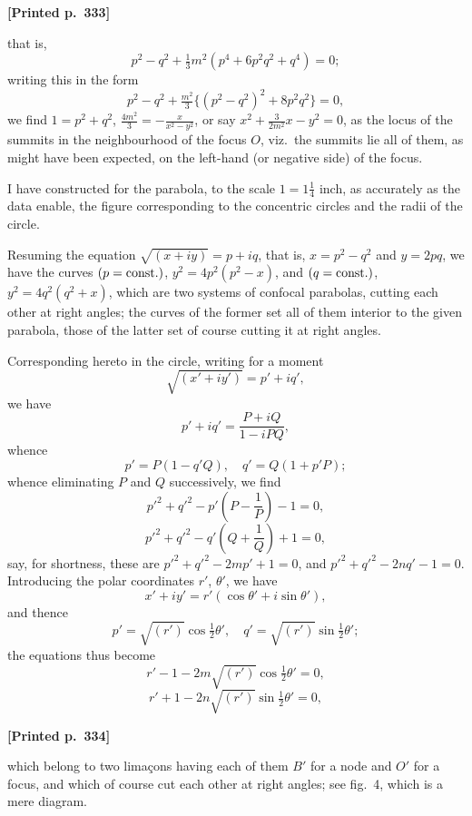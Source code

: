 \documentclass[11pt]{article}
\begin{document}
\medskip

\noindent\textbf{[Printed p.~333]}\hfill

\noindent that is,
\[
p^{2} - q^{2} + \tfrac{1}{3}m^{2}(p^{4} + 6p^{2}q^{2} + q^{4}) = 0;
\]
writing this in the form
\[
p^{2} - q^{2} + \tfrac{m^{2}}{3}\bigl\{(p^{2}-q^{2})^{2} + 8p^{2}q^{2}\bigr\} = 0,
\]
we find $1=p^{2}+q^{2}$, $\tfrac{4m^{2}}{3}=-\tfrac{x}{x^{2}-y^{2}}$, or say $x^{2}+\tfrac{3}{2m^{2}}x - y^{2}=0$, as the locus of the summits in the neighbourhood of the focus $O$, viz.\ the summits lie all of them, as might have been expected, on the left-hand (or negative side) of the focus.

I have constructed for the parabola, to the scale $1=1\tfrac{1}{4}$ inch, as accurately as the data enable, the figure corresponding to the concentric circles and the radii of the circle.

Resuming the equation $\sqrt{(x+iy)}=p+iq$, that is, $x=p^{2}-q^{2}$ and $y=2pq$, we have the curves $(p=\textnormal{const.})$, $y^{2}=4p^{2}(p^{2}-x)$, and $(q=\textnormal{const.})$, $y^{2}=4q^{2}(q^{2}+x)$, which are two systems of confocal parabolas, cutting each other at right angles; the curves of the former set all of them interior to the given parabola, those of the latter set of course cutting it at right angles.

Corresponding hereto in the circle, writing for a moment
\[
\sqrt{(x'+iy')} = p'+iq',
\]
we have
\[
p'+iq' = \frac{P+iQ}{1-iPQ},
\]
whence
\[
p' = P(1-q'Q),\quad q' = Q(1+p'P);
\]
whence eliminating $P$ and $Q$ successively, we find
\[
p'^{2} + q'^{2} - p'\left(P - \frac{1}{P}\right) - 1 = 0,
\]
\[
p'^{2} + q'^{2} - q'\left(Q + \frac{1}{Q}\right) + 1 = 0,
\]
say, for shortness, these are $p'^{2} + q'^{2} - 2mp' + 1 = 0$, and $p'^{2} + q'^{2} - 2nq' - 1 = 0$. Introducing the polar coordinates $r'$, $\theta'$, we have
\[
x' + iy' = r'(\cos\theta' + i\sin\theta'),
\]
and thence
\[
p' = \sqrt{(r')}\cos\tfrac{1}{2}\theta',\quad q' = \sqrt{(r')}\sin\tfrac{1}{2}\theta';
\]
the equations thus become
\[
r' - 1 - 2m\sqrt{(r')}\cos\tfrac{1}{2}\theta' = 0,
\]
\[
r' + 1 - 2n\sqrt{(r')}\sin\tfrac{1}{2}\theta' = 0,
\]

\medskip

\noindent\textbf{[Printed p.~334]}\hfill

\noindent which belong to two lima\c{c}ons having each of them $B'$ for a node and $O'$ for a focus, and which of course cut each other at right angles; see fig.~4, which is a mere diagram.

\medskip
\end{document}
